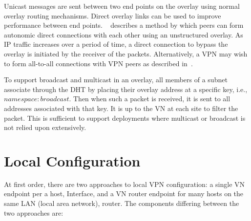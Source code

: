 Unicast messages are sent between two end points on the overlay using normal
overlay routing mechanisms.  Direct overlay links can be used to improve
performance between end points.  ~\cite{ipop} describes a method by which peers
can form autonomic direct connections with each other using an unstructured
overlay.  As IP traffic increases over a period of time, a direct connection to
bypass the overlay is initiated by the receiver of the packets.  Alternatively,
a VPN may wish to form all-to-all connections with VPN peers as described
in~\cite{cops08}.

To support broadcast and multicast in an overlay, all members of a subnet
associate through the DHT by placing their overlay address at a specific key,
i.e., $namespace:broadcast$.  Then when such a packet is received, it is sent
to all addresses associated with that key.  It is up to the VN at each site to
filter the packet.  This is sufficient to support deployments where multicast
or broadcast is not relied upon extensively.  

\section{Local Configuration} At first order, there are two approaches to local
VPN configuration: a single VN endpoint per a host, Interface, and a VN router
endpoint for many hosts on the same LAN (local area network), router.  The
components differing between the two approaches are:

